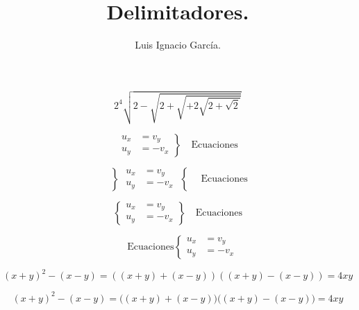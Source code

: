 \documentclass{report}
\begin{document}
\title{Delimitadores.}
\author{Luis Ignacio Garc\'ia.}
\maketitle


$$2^{4}\sqrt{2-\sqrt{2+\sqrt{+2\sqrt{2+\sqrt{2}}}}}$$

\begin{equation*}
 \left.
 \begin{aligned}
 u_x &= v_y \\
u_y & =-v_x
\end {aligned}
\right\}
\quad\text{Ecuaciones}
\end{equation*}

\begin{equation*}
 \left\}
 \begin{aligned}
 u_x &= v_y \\
u_y & =-v_x
\end {aligned}
\right\{
\quad\text{Ecuaciones}
\end{equation*}

\begin{equation*}
 \left\{
 \begin{aligned}
 u_x &= v_y \\
u_y & =-v_x
\end {aligned}
\right\}
\quad\text{Ecuaciones}
\end{equation*}


\begin{equation*}
\quad\text{Ecuaciones}
 \left\{
 \begin{aligned}
 u_x &= v_y \\
u_y & =-v_x
\end {aligned}
\right.
\end{equation*}

\begin{equation*}
(x+y)^2-(x-y)=\left((x+y)+(x-y)\right)\left((x+y)-(x-y)\right)=4xy
\end{equation*}

\begin{equation*}
(x+y)^2-(x-y)=\bigl((x+y)+(x-y)\bigl)\bigl((x+y)-(x-y)\bigl)=4xy
\end{equation*}
\end{document}
